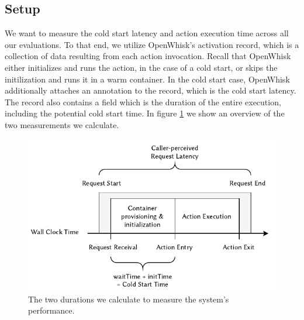 \subsection{Setup}

We want to measure the cold start latency and action execution time across all our evaluations. To that end, we utilize OpenWhisk's activation record, which is a collection of data resulting from each action invocation.  Recall that OpenWhisk either initializes and runs the action, in the case of a cold start, or skips the initilization and runs it in a warm container. In the cold start case, OpenWhisk additionally attaches an  annotation to the record, which is the cold start latency. The record also contains a  field which is the duration of the entire execution, including the potential cold start time. In figure \ref{fig:evaluation-time-measurement} we show an overview of the two measurements we calculate.

\begin{figure}
    \begin{center}
        \includegraphics{figures/EvaluationTimeMeasurement.pdf}
    \end{center}
    \caption{The two durations we calculate to measure the system's performance.}
    \label{fig:evaluation-time-measurement}
\end{figure}


